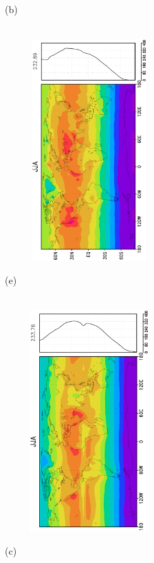 \documentclass[12pt,a4paper,twoside,openright,headinclude,liststotoc,bibtotoc]{scrreprt}
\begin{document}
\begin{figure}[H]
{}
\parbox{8.5cm}{\hspace{0.50cm}\begin{scriptsize}(b)\end{scriptsize} \vspace{-0.7cm} \\
\includegraphics[height=8.5cm,width=6.5cm,angle=-90]
{eps/zonalysmsolrad178JJA.eps}
}
\parbox{8.5cm}{\hspace{0.26cm}\begin{scriptsize}(e)\end{scriptsize} \vspace{-0.7cm} \\
\includegraphics[height=8.5cm,width=6.5cm,angle=-90]
{eps/zonalt21ysmsolradJJA.eps}
}
\parbox{8.4cm}{\hspace{0.50cm}\begin{scriptsize}(c)\end{scriptsize} \vspace{-0.7cm} \\
}
\end{figure}
\end{document}
